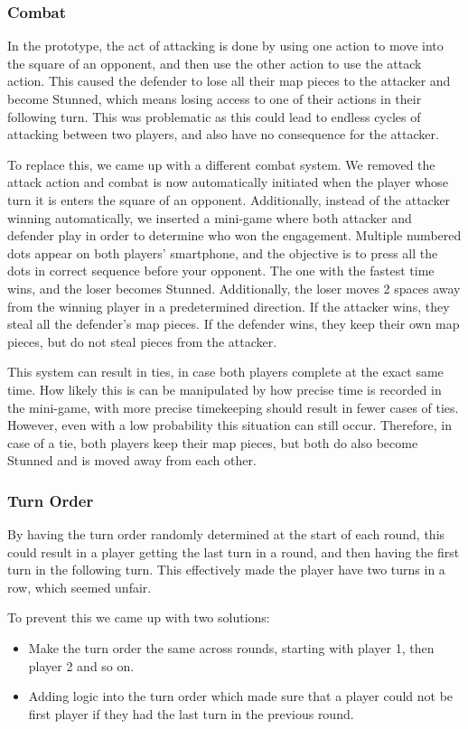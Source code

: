 \subsubsection{Combat}
In the prototype, the act of attacking is done by using one action to move into the square of an opponent, and then use the other action to use the attack action. This caused the defender to lose all their map pieces to the attacker and become Stunned, which means losing access to one of their actions in their following turn. This was problematic as this could lead to endless cycles of attacking between two players, and also have no consequence for the attacker.

To replace this, we came up with a different combat system. We removed the attack action and combat is now automatically initiated when the player whose turn it is enters the square of an opponent. Additionally, instead of the attacker winning automatically, we inserted a mini-game where both attacker and defender play in order to determine who won the engagement. Multiple numbered dots appear on both players’ smartphone, and the objective is to press all the dots in correct sequence before your opponent. The one with the fastest time wins, and the loser becomes Stunned. Additionally, the loser moves 2 spaces away from the winning player in a predetermined direction. If the attacker wins, they steal all the defender’s map pieces. If the defender wins, they keep their own map pieces, but do not steal pieces from the attacker.

This system can result in ties, in case both players complete at the exact same time. How likely this is can be manipulated by how precise time is recorded in the mini-game, with more precise timekeeping should result in fewer cases of ties. However, even with a low probability this situation can still occur. Therefore, in case of a tie, both players keep their map pieces, but both do also become Stunned and is moved away from each other.

\subsubsection{Turn Order}
By having the turn order randomly determined at the start of each round, this could result in a player getting the last turn in a round, and then having the first turn in the following turn. This effectively made the player have two turns in a row, which seemed unfair.


To prevent this we came up with two solutions:
\begin{itemize}
\item Make the turn order the same across rounds, starting with player 1, then player 2 and so on.
\item Adding logic into the turn order which made sure that a player could not be first player if they had the last turn in the previous round.
\end{itemize}

